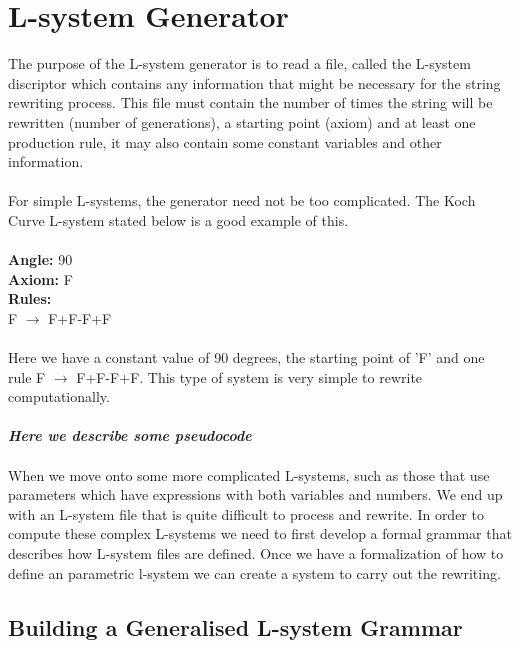 \section{L-system Generator}

The purpose of the L-system generator is to read a file, called the L-system discriptor which contains any information that might be necessary for the string rewriting process. This file must contain the number of times the string will be rewritten (number of generations), a starting point (axiom) and at least one production rule, it may also contain some constant variables and other information. \\
\\
For simple L-systems, the generator need not be too complicated. The Koch Curve L-system stated below is a good example of this. \\
\\
\textbf{Angle:} 90\\
\textbf{Axiom:} F\\
\textbf{Rules:} \\
F $\rightarrow$ F+F-F+F\\
\\
Here we have a constant value of 90 degrees, the starting point of 'F' and one rule F $\rightarrow$ F+F-F+F. This type of system is very simple to rewrite computationally. \\ 
\\
\textbf{\textit{Here we describe some pseudocode}}\\
\\
When we move onto some more complicated L-systems, such as those that use parameters which have expressions with both variables and numbers. We end up with an L-system file that is quite difficult to process and rewrite. In order to compute these complex L-systems we need to first develop a formal grammar that describes how L-system files are defined. Once we have a formalization of how to define an parametric l-system we can create a system to carry out the rewriting.

\subsection{Building a Generalised L-system Grammar}

